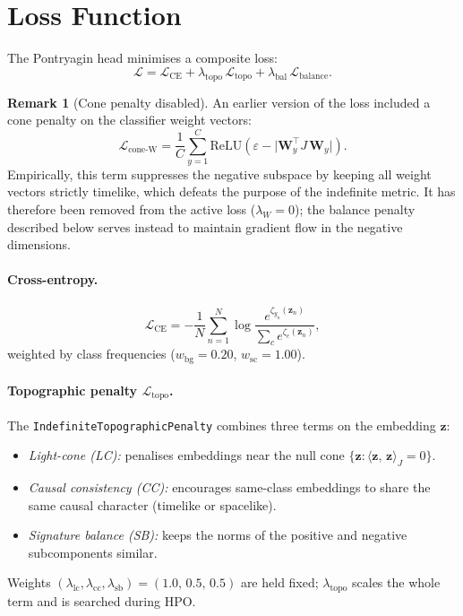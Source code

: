 \documentclass[12pt,a4paper]{article}
\newcommand{\Jprod}[2]{\langle #1,\, #2 \rangle_J}
\theoremstyle{definition}
\newtheorem{remark}{Remark}
\begin{document}
\section{Loss Function}

The Pontryagin head minimises a composite loss:
\[
  \mathcal{L} = \mathcal{L}_{\text{CE}}
              + \lambda_{\text{topo}}\, \mathcal{L}_{\text{topo}}
              + \lambda_{\text{bal}}\,  \mathcal{L}_{\text{balance}}.
\]

\begin{remark}[Cone penalty disabled]
An earlier version of the loss included a cone penalty on the classifier
weight vectors:
\[
  \mathcal{L}_{\text{cone-W}}
  = \frac{1}{C}\sum_{y=1}^C
    \mathrm{ReLU}\!\left(\varepsilon - \bigl|\mathbf{W}_y^\top J\, \mathbf{W}_y\bigr|\right).
\]
Empirically, this term suppresses the negative subspace by keeping all
weight vectors strictly timelike, which defeats the purpose of the
indefinite metric.  It has therefore been removed from the active loss
($\lambda_W = 0$); the balance penalty described below serves instead to
maintain gradient flow in the negative dimensions.
\end{remark}

\paragraph{Cross-entropy.}
\[
  \mathcal{L}_{\text{CE}} =
  -\frac{1}{N}\sum_{n=1}^N \log \frac{e^{\zeta_{y_n}(\mathbf{z}_n)}}
                                     {\sum_c e^{\zeta_c(\mathbf{z}_n)}},
\]
weighted by class frequencies ($w_{\text{bg}}=0.20$, $w_{\text{sc}}=1.00$).

\paragraph{Topographic penalty $\mathcal{L}_{\text{topo}}$.}
The \texttt{IndefiniteTopographicPenalty} combines three terms on the
embedding $\mathbf{z}$:
\begin{itemize}[noitemsep]
  \item \emph{Light-cone (LC):} penalises embeddings near the null cone
        $\{\mathbf{z} : \Jprod{\mathbf{z}}{\mathbf{z}} = 0\}$.
  \item \emph{Causal consistency (CC):} encourages same-class embeddings to
        share the same causal character (timelike or spacelike).
  \item \emph{Signature balance (SB):} keeps the norms of the positive and
        negative subcomponents similar.
\end{itemize}
Weights $(\lambda_{\text{lc}}, \lambda_{\text{cc}}, \lambda_{\text{sb}}) =
(1.0,\, 0.5,\, 0.5)$ are held fixed; $\lambda_{\text{topo}}$ scales the
whole term and is searched during HPO.
\end{document}

